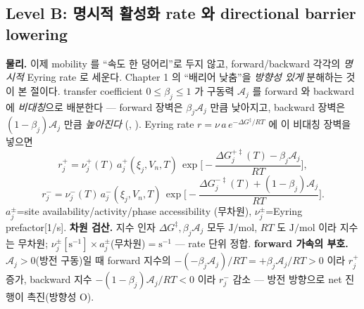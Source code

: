 \subsection{Level B: 명시적 활성화 rate 와 directional barrier lowering}\label{sec:ch3_levelB}
\textbf{물리.} 이제 mobility 를 ``속도 한 덩어리''로 두지 않고, forward/backward 각각의 \emph{명시적} Eyring
rate 로 세운다. Chapter 1 의 ``배리어 낮춤''을 \emph{방향성 있게} 분해하는 것이 본 절이다. transfer coefficient
$0\le\beta_j\le1$ 가 구동력 $\mathcal A_j$ 를 forward 와 backward 에 \emph{비대칭}으로 배분한다 — forward 장벽은
$\beta_j\mathcal A_j$ 만큼 낮아지고, backward 장벽은 $(1-\beta_j)\mathcal A_j$ 만큼 \emph{높아진다}
(\cite{evanspolanyi1938,bardfaulkner,bazant2013}, ). Eyring rate $r=\nu\,a\,e^{-\Delta G^\ddagger/RT}$ 에
이 비대칭 장벽을 넣으면
\begin{equation}
r_j^+=\nu_j^+(T)\,a_j^+(\xi_j,V_n,T)\,\exp\!\Big[-\frac{\Delta G_j^{+\ddagger}(T)-\beta_j\mathcal A_j}{RT}\Big],
\label{eq:ch3_rplus}
\end{equation}
\begin{equation}
r_j^-=\nu_j^-(T)\,a_j^-(\xi_j,V_n,T)\,\exp\!\Big[-\frac{\Delta G_j^{-\ddagger}(T)+(1-\beta_j)\mathcal A_j}{RT}\Big].
\label{eq:ch3_rminus}
\end{equation}
$a_j^\pm$=site availability/activity/phase accessibility (무차원), $\nu_j^\pm$=Eyring prefactor[1/s].
\textbf{차원 검산.} 지수 인자 $\Delta G^\ddagger,\beta_j\mathcal A_j$ 모두 $\mathrm{J/mol}$, $RT$ 도
$\mathrm{J/mol}$ 이라 지수는 무차원; $\nu_j^\pm[\mathrm{s^{-1}}]\times a_j^\pm$(무차원)$=\mathrm{s^{-1}}$ — rate
단위 정합. \textbf{forward 가속의 부호.} $\mathcal A_j>0$(방전 구동)일 때 forward 지수의 $-(-\beta_j\mathcal A_j)/RT
=+\beta_j\mathcal A_j/RT>0$ 이라 $r_j^+$ 증가, backward 지수 $-(1-\beta_j)\mathcal A_j/RT<0$ 이라 $r_j^-$ 감소 —
방전 방향으로 net 진행이 촉진(방향성 O).

